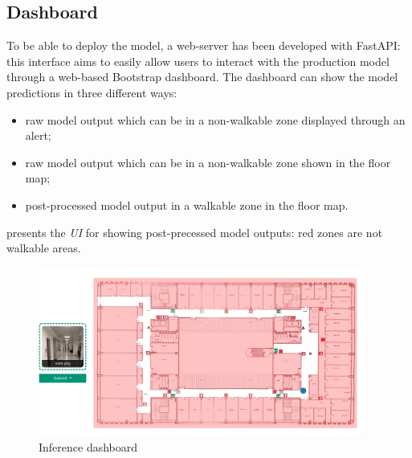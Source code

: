 \subsection{Dashboard}
To be able to deploy the model, a web-server has been developed with FastAPI: this interface aims to easily allow users to interact with the production model through a web-based Bootstrap dashboard.
The dashboard can show the model predictions in three different ways:
\begin{itemize}
    \item raw model output which can be in a non-walkable zone displayed through an alert;
    \item raw model output which can be in a non-walkable zone shown in the floor map;
    \item post-processed model output in a walkable zone in the floor map.
\end{itemize}
 presents the \textit{UI} for showing post-precessed model outputs: red zones are not walkable areas.
\begin{figure}[htbp]
    \begin{center}
        \includegraphics[width=0.95\textwidth]{./imgs/dashboard.png}
    \end{center}
    \caption{Inference dashboard}
    \label{fig:dashboard}
\end{figure}
